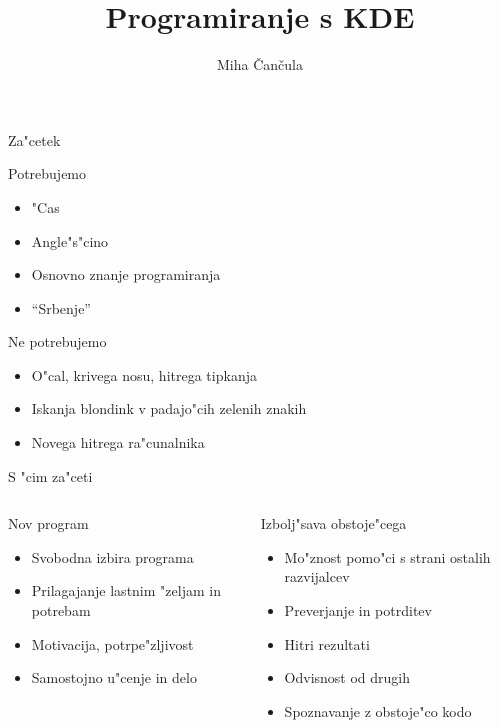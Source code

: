 \documentclass{beamer}
\title{Programiranje s KDE}
\author{Miha \v Can\v cula}
\begin{document}
\frame{\titlepage}

\begin{frame}{Za"cetek}
  \begin{block}{Potrebujemo}
    \begin{itemize}
      \item "Cas
      \item Angle"s"cino
      \item Osnovno znanje programiranja
      \item ``Srbenje''
    \end{itemize}
  \end{block}
  \begin{block}{Ne potrebujemo}
    \begin{itemize}
      \item O"cal, krivega nosu, hitrega tipkanja
      \item Iskanja blondink v padajo"cih zelenih znakih
      \item Novega hitrega ra"cunalnika
    \end{itemize}
  \end{block}
\end{frame}

\begin{frame}{S "cim za"ceti}
 \begin{columns}
  \begin{column}{.47\textwidth}
   \begin{block}{Nov program}
    \begin{itemize}
     \item Svobodna izbira programa 
     \item Prilagajanje lastnim "zeljam in potrebam \\[1cm]
     \item Motivacija, potrpe"zljivost
    \item Samostojno u"cenje in delo
    \end{itemize}
   \end{block}
  \end{column}
  \begin{column}{.47\textwidth}
   \begin{block}{Izbolj"sava obstoje"cega}
    \begin{itemize}
     \item Mo"znost pomo"ci s strani ostalih razvijalcev
     \item Preverjanje in potrditev
      \item Hitri rezultati \\[.5cm]
     \item Odvisnost od drugih
     \item Spoznavanje z obstoje"co kodo
    \end{itemize}
   \end{block}
  \end{column}
 \end{columns}
\end{frame}
\end{document}

